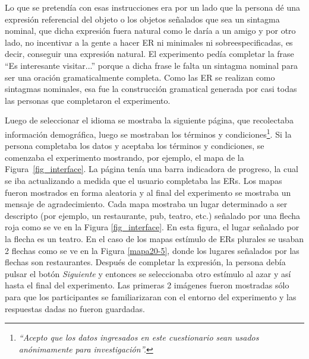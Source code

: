 
Lo que se pretend\'ia con esas instrucciones era por un lado que la persona d\'e una expresi\'on referencial del objeto o los objetos se\~nalados que sea un sintagma nominal, que dicha expresi\'on fuera natural como le dar\'ia a un amigo y por otro lado, no incentivar a la gente a hacer ER ni minimales ni sobreespecificadas, es decir, conseguir una expresi\'on natural. 
El experimento ped\'ia completar la frase ``Es interesante visitar...'' porque a dicha frase le falta un sintagma nominal para ser una oraci\'on gramaticalmente completa. Como las ER se realizan como sintagmas nominales, esa fue la construcci\'on gramatical generada por casi todas las personas que completaron el experimento.

Luego de seleccionar el idioma se mostraba la siguiente p\'agina, que recolectaba informaci\'on demogr\'afica, luego se mostraban los t\'erminos y condiciones\footnote{%
   \emph{ ``Acepto que los datos ingresados en este cuestionario sean usados an\'onimamente para investigaci\'on''.}
  }. 
Si la persona completaba los datos y aceptaba los t\'erminos y condiciones, se comenzaba el experimento mostrando, por ejemplo, el mapa de la Figura~\ref{fig_interface}.
La p\'agina ten\'{i}a una barra indicadora de progreso, la cual se iba actualizando a medida que el usuario completaba las ERs. Los mapas fueron mostrados en forma aleatoria y al final del experimento se mostraba un mensaje de agradecimiento.
Cada mapa mostraba un lugar determinado a ser descripto (por ejemplo, un restaurante, pub, teatro, etc.) se\~nalado por una flecha roja como se ve en la Figura \ref{fig_interface}. En esta figura, el lugar se\~nalado por la flecha es un teatro. En el caso de los mapas est\'imulo de ERs plurales se usaban 2 flechas como se ve en la Figura \ref{mapa20-5}, donde los lugares se\~nalados por las flechas son restaurantes. Despu\'es de completar la expresi\'on, la persona deb\'ia pulsar el bot\'on \emph{Siguiente} y entonces se seleccionaba otro est\'{i}mulo al azar y as\'{i} hasta el final del experimento. Las primeras 2 im\'agenes fueron mostradas s\'olo para que los participantes se familiarizaran con el entorno del experimento y las respuestas dadas no fueron guardadas.

